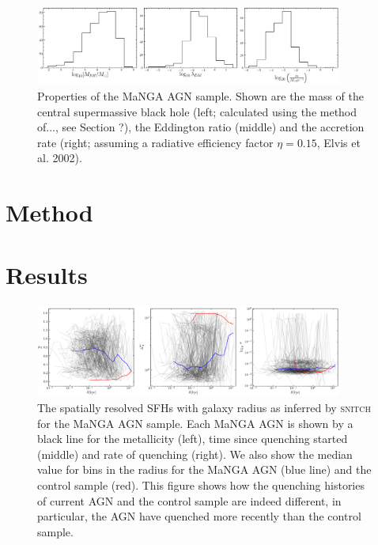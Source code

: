 \documentclass[useAMS,usenatbib]{mn2e}
\begin{document}
\begin{figure}
\includegraphics[width=0.9\textwidth]{../data/ellison/figures/mangaagn_sample_agn_properties.png}
\caption{Properties of the MaNGA AGN sample. Shown are the mass of the central supermassive black hole (left; calculated using the method of..., see Section ?), the Eddington ratio (middle) and the accretion rate (right; assuming a radiative efficiency factor $\eta=0.15$, Elvis et al. 2002).}
\end{figure}


\section{Method}\label{sec:method}

\section{Results}\label{sec:results}


\begin{figure}
\includegraphics[width=0.9\textwidth]{../data/ellison/figures/manga_agn_spaghetti.png}
\caption{The spatially resolved SFHs with galaxy radius as inferred by \textsc{snitch} for the MaNGA AGN sample. Each MaNGA AGN is shown by a black line for the metallicity (left), time since quenching started (middle) and rate of quenching (right). We also show the median value for bins in the radius for the MaNGA AGN (blue line) and the control sample (red). This figure shows how the quenching histories of current AGN and the control sample are indeed different, in particular, the AGN have quenched more recently than the control sample.}
\end{figure}
\end{document}
